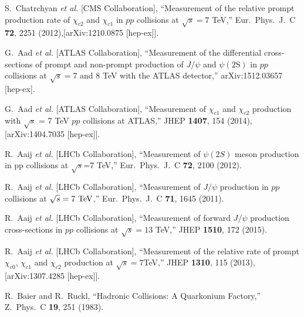 \documentclass[aps,prc,preprint,superscriptaddress,showpacs,showkeys,amsmath]{revtex4-1}
\begin{document}
\begin{thebibliography}{100}
  S.~Chatrchyan {\it et al.} [CMS Collaboration],
  ``Measurement of the relative prompt production rate of $\chi_{c2}$ and $\chi_{c1}$ 
  in $pp$ collisions at $\sqrt{s}=7$ TeV,''
  Eur.\ Phys.\ J.\ C {\bf 72}, 2251 (2012),[arXiv:1210.0875 [hep-ex]].


  G.~Aad {\it et al.} [ATLAS Collaboration],
  ``Measurement of the differential cross-sections of prompt and non-prompt production of $J/\psi$ 
  and $\psi(2\mathrm{S})$ in $pp$ collisions at $\sqrt{s} = 7$ and $8$ TeV with the ATLAS detector,''
  arXiv:1512.03657 [hep-ex].


  G.~Aad {\it et al.} [ATLAS Collaboration],
  ``Measurement of $\chi_{c1}$ and $\chi_{c2}$ production with $\sqrt{s}$ = 7 TeV $pp$ collisions at ATLAS,''
  JHEP {\bf 1407}, 154 (2014), [arXiv:1404.7035 [hep-ex]].


  R.~Aaij {\it et al.} [LHCb Collaboration],
  ``Measurement of $\psi(2S)$ meson production in pp collisions at $\sqrt{s}$=7 TeV,''
  Eur.\ Phys.\ J.\ C {\bf 72}, 2100 (2012).


  R.~Aaij {\it et al.} [LHCb Collaboration],
  ``Measurement of $J/\psi$ production in $pp$ collisions at $\sqrt{s}=7~\rm{TeV}$,''
  Eur.\ Phys.\ J.\ C {\bf 71}, 1645 (2011).

  R.~Aaij {\it et al.} [LHCb Collaboration],
  ``Measurement of forward $J/\psi$ production cross-sections in $pp$ collisions at $\sqrt{s}=13$ TeV,''
  JHEP {\bf 1510}, 172 (2015).




  R.~Aaij {\it et al.} [LHCb Collaboration],
  ``Measurement of the relative rate of prompt $\chi_{c0}$, $\chi_{c1}$ and $\chi_{c2}$ production at $\sqrt{s}=7$TeV,''
  JHEP {\bf 1310}, 115 (2013), [arXiv:1307.4285 [hep-ex]].
 




  R.~Baier and R.~Ruckl,
  ``Hadronic Collisions: A Quarkonium Factory,''
  Z.\ Phys.\ C {\bf 19}, 251 (1983).



\end{thebibliography}
\end{document}
